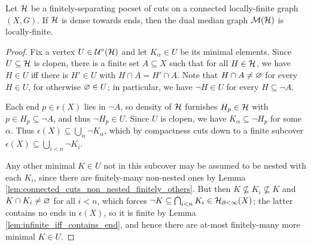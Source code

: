 \documentclass[reqno]{amsart}
\begin{document}
    \begin{lemma}\label{lem:dual_median_graph_of_dense_cuts_locally_finite}
        Let $\mc{H}$ be a finitely-separating pocset of cuts on a connected locally-finite graph $(X,G)$. If $\mc{H}$ is dense towards ends, then the dual median graph $\mc{M}(\mc{H})$ is locally-finite.
    \end{lemma}
    \begin{proof}
        Fix a vertex $U\in\mc{U}^\circ(\mc{H})$ and let $K_\alpha\in U$ be its minimal elements. Since $U\subseteq\mc{H}$ is clopen, there is a finite set $A\subseteq X$ such that for all $H\in\mc{H}$, we have $H\in U$ iff there is $H'\in U$ with $H\cap A=H'\cap A$. Note that $H\cap A\neq\em$ for every $H\in U$, for otherwise $\em\in U$; in particular, we have $\lnot H\in U$ for every $H\subseteq\lnot A$.

        Each end $p\in\epsilon(X)$ lies in $\lnot A$, so density of $\mc{H}$ furnishes $H_p\in\mc{H}$ with $p\in H_p\subseteq\lnot A$, and thus $\lnot H_p\in U$. Since $U$ is clopen, we have $K_\alpha\subseteq\lnot H_p$ for some $\alpha$. Thus $\epsilon(X)\subseteq\bigcup_\alpha\lnot K_\alpha$, which by compactness cuts down to a finite subcover $\epsilon(X)\subseteq\bigcup_{i<n}\lnot K_i$.

        Any other minimal $K\in U$ not in this subcover may be assumed to be nested with each $K_i$, since there are finitely-many non-nested ones by Lemma \ref{lem:connected_cuts_non_nested_finitely_others}. But then $K\not\subseteq K_i\not\subseteq K$ and $K\cap K_i\neq\em$ for all $i<n$, which forces $\lnot K\subseteq\bigcap_{i<n}K_i\in\mc{H}_{\del<\infty}(X)$; the latter contains no ends in $\epsilon(X)$, so it is finite by Lemma \ref{lem:infinite_iff_contains_end}, and hence there are at-most finitely-many more minimal $K\in U$.
    \end{proof}


\end{document}
